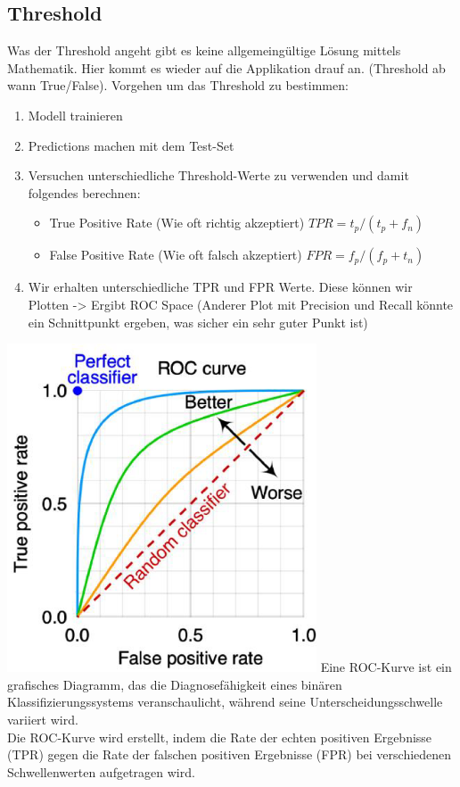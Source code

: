 \subsection{Threshold}
Was der Threshold angeht gibt es keine allgemeingültige Lösung mittels Mathematik. Hier kommt es wieder auf die Applikation drauf an. (Threshold ab wann True/False). Vorgehen um das Threshold zu bestimmen:
\begin{enumerate}
\item Modell trainieren
\item Predictions machen mit dem Test-Set
\item Versuchen unterschiedliche Threshold-Werte zu verwenden und damit folgendes berechnen:
\begin{itemize}
\item True Positive Rate (Wie oft richtig akzeptiert) $TPR = t_p/(t_p + f_n)$
\item False Positive Rate (Wie oft falsch akzeptiert) $FPR = f_p/(f_p + t_n)$
\end{itemize}
\item Wir erhalten unterschiedliche TPR und FPR Werte. Diese können wir Plotten -> Ergibt ROC Space (Anderer Plot mit Precision und Recall könnte ein Schnittpunkt ergeben, was sicher ein sehr guter Punkt ist)
\end{enumerate}
\includegraphics[width=\linewidth]{img/treshold.png}
Eine ROC-Kurve ist ein grafisches Diagramm, das die Diagnosefähigkeit eines binären Klassifizierungssystems veranschaulicht, während seine Unterscheidungsschwelle variiert wird. \\
Die ROC-Kurve wird erstellt, indem die Rate der echten positiven Ergebnisse (TPR) gegen die Rate der falschen positiven Ergebnisse (FPR) bei verschiedenen Schwellenwerten aufgetragen wird.
